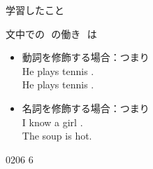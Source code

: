 \documentclass[aspectratio=169,xcolor={dvipsnames,table}]{beamer}
\begin{document}
\begin{frame}[plain]{学習したこと}
 
\begin{block}{文中での\,\,\,\,の働き}
 \,\,は

\begin{itemize}[square]
 \item 動詞を修飾する場合：つまり\\
\hfill{}He plays tennis .\\
\hfill{}He plays tennis .

 \item 名詞を修飾する場合：つまり\\
\hfill{I know a girl .\\
\hfill{}The soup  is hot.}
\end{itemize}
\end{block}

\hfill{\tiny 0206}\,{\scriptsize {}\,6}

\end{frame}
\end{document}
